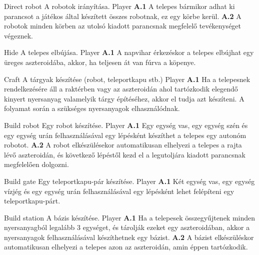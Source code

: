 \documentclass[../../projlab]{subfiles}
\begin{document}
\begin{use-case}
	{Direct robot}
	{A robotok irányítása.}
	{Player}
    \textbf{A.1} A telepes bármikor adhat ki parancsot a játékos által készített összes robotnak, ez egy körbe kerül. 
	\newline
	\textbf{A.2} A robotok minden körben az utolsó kiadott parancsnak megfelelő tevékenységet végeznek.
\end{use-case}

\begin{use-case}
	{Hide}
	{A telepes elbújása.}
	{Player}
    \textbf{A.1} A napvihar érkezéskor a telepes elbújhat egy üreges aszteroidába, akkor, ha teljesen át van fúrva a köpenye.
\end{use-case}

\begin{use-case}
	{Craft}
	{A tárgyak készítése (robot, teleportkapu stb.)}
	{Player}
    \textbf{A.1} Ha a telepesnek rendelkezésére áll a raktérben vagy az aszteroidán ahol tartózkodik elegendő kinyert nyersanyag valamelyik tárgy építéséhez, akkor el tudja azt készíteni. A folyamat során a szükséges nyersanyagok elhasználódnak.
\end{use-case}

\begin{use-case}
	{Build robot}
	{Egy robot készítése.}
	{Player}
    \textbf{A.1} Egy egység vas, egy egység szén és egy egység urán felhasználásával egy lépésként készíthet a telepes egy autonóm robotot.
	\newline
	\textbf{A.2} A robot elkészülésekor automatikusan elhelyezi a telepes a rajta lévő aszteroidán, és következő lépéstől kezd el a legutoljára kiadott parancsnak megfelelően dolgozni.
\end{use-case}

\begin{use-case}
	{Build gate}
	{Egy teleportkapu-pár készítése.}
	{Player}
    \textbf{A.1} Két egység vas, egy egység vízjég és egy egység urán felhasználásával egy lépésként lehet felépíteni egy teleportkapu-párt.
\end{use-case}

\begin{use-case}
	{Build station}
	{A bázis készítése.}
	{Player}
    \textbf{A.1} Ha a telepesek összegyűjtenek minden nyersanyagból legalább 3 egységet, és tárolják ezeket egy aszteroidában, akkor a nyersanyagok felhasználásával készíthetnek egy bázist.
	\newline
	\textbf{A.2} A bázist elkészüléskor automatikusan elhelyezi a telepes azon az aszteroidán, amin éppen tartózkodik.
\end{use-case}
\end{document}
